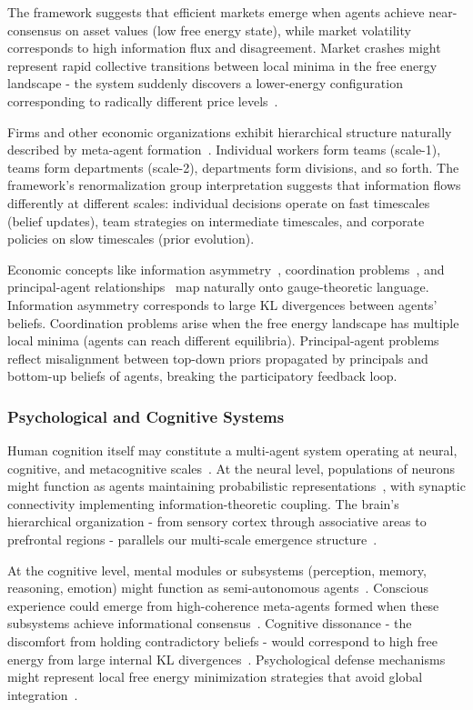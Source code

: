 \documentclass[11pt]{article}
\begin{document}
The framework suggests that efficient markets emerge when agents achieve near-consensus on asset values (low free energy state), while market volatility corresponds to high information flux and disagreement. Market crashes might represent rapid collective transitions between local minima in the free energy landscape - the system suddenly discovers a lower-energy configuration corresponding to radically different price levels~\cite{Sornette2003}.

Firms and other economic organizations exhibit hierarchical structure naturally described by meta-agent formation~\cite{Simon1962,Williamson1975}. Individual workers form teams (scale-1), teams form departments (scale-2), departments form divisions, and so forth. The framework's renormalization group interpretation suggests that information flows differently at different scales: individual decisions operate on fast timescales (belief updates), team strategies on intermediate timescales, and corporate policies on slow timescales (prior evolution).

Economic concepts like information asymmetry~\cite{Akerlof1970,Stiglitz2000}, coordination problems~\cite{Cooper1999}, and principal-agent relationships~\cite{Jensen1976,Holmstrom1979} map naturally onto gauge-theoretic language. Information asymmetry corresponds to large KL divergences between agents' beliefs. Coordination problems arise when the free energy landscape has multiple local minima (agents can reach different equilibria). Principal-agent problems reflect misalignment between top-down priors propagated by principals and bottom-up beliefs of agents, breaking the participatory feedback loop.

\subsubsection{Psychological and Cognitive Systems}

Human cognition itself may constitute a multi-agent system operating at neural, cognitive, and metacognitive scales~\cite{Minsky1986,Dennett1991}. At the neural level, populations of neurons might function as agents maintaining probabilistic representations~\cite{Pouget2013}, with synaptic connectivity implementing information-theoretic coupling. The brain's hierarchical organization - from sensory cortex through associative areas to prefrontal regions - parallels our multi-scale emergence structure~\cite{Felleman1991,Bressler2010}.

At the cognitive level, mental modules or subsystems (perception, memory, reasoning, emotion) might function as semi-autonomous agents~\cite{Fodor1983}. Conscious experience could emerge from high-coherence meta-agents formed when these subsystems achieve informational consensus~\cite{Tononi2004,Dehaene2014}. Cognitive dissonance - the discomfort from holding contradictory beliefs - would correspond to high free energy from large internal KL divergences~\cite{Festinger1957}. Psychological defense mechanisms might represent local free energy minimization strategies that avoid global integration~\cite{Freud1936}.
\end{document}
